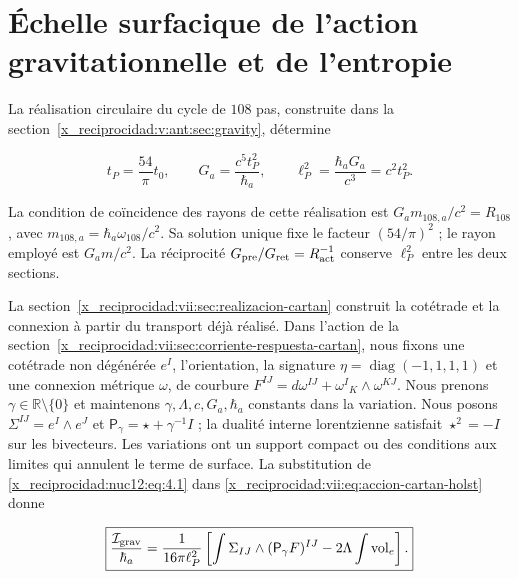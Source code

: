 \section{Échelle surfacique de l’action gravitationnelle et de l’entropie}

La réalisation circulaire du cycle de \(108\) pas, construite dans la section~\ref{x_reciprocidad:v:ant:sec:gravity}, détermine



\begin{equation}
t_P=\frac{54}{\pi}t_0,\qquad
G_a=\frac{c^5t_P^2}{\hbar_a},\qquad
\ell_P^2=\frac{\hbar_aG_a}{c^3}=c^2t_P^2.
\label{x_reciprocidad:nuc12:eq:4.1}
\end{equation}



La condition de coïncidence des rayons de cette réalisation est \(G_a m_{108,a}/c^2=R_{108}\), avec \(m_{108,a}=\hbar_a\omega_{108}/c^2\). Sa solution unique fixe le facteur \((54/\pi)^2\) ; le rayon employé est \(G_a m/c^2\). La réciprocité \(G_{\rm pre}/G_{\rm ret}=R_{\rm act}^{-1}\) conserve \(\ell_P^2\) entre les deux sections.

La section~\ref{x_reciprocidad:vii:sec:realizacion-cartan} construit la cotétrade et la connexion à partir du transport déjà réalisé. Dans l’action de la section~\ref{x_reciprocidad:vii:sec:corriente-respuesta-cartan}, nous fixons une cotétrade non dégénérée \(e^I\), l’orientation, la signature \(\eta=\operatorname{diag}(-1,1,1,1)\) et une connexion métrique \(\omega\), de courbure \(F^{IJ}=d\omega^{IJ}+\omega^I{}_{K}\wedge\omega^{KJ}\). Nous prenons \(\gamma\in\mathbb R\setminus\{0\}\) et maintenons \(\gamma,\Lambda,c,G_a,\hbar_a\) constants dans la variation. Nous posons \(\Sigma^{IJ}=e^I\wedge e^J\) et \(\mathsf P_\gamma=\star+\gamma^{-1}I\) ; la dualité interne lorentzienne satisfait \(\star^2=-I\) sur les bivecteurs. Les variations ont un support compact ou des conditions aux limites qui annulent le terme de surface. La substitution de \eqref{x_reciprocidad:nuc12:eq:4.1} dans \eqref{x_reciprocidad:vii:eq:accion-cartan-holst} donne



\begin{equation}
\boxed{\frac{\mathcal I_{\rm grav}}{\hbar_a}
=\frac1{16\pi\ell_P^2}
\left[\int\Sigma_{IJ}\wedge(\mathsf P_\gamma F)^{IJ}
-2\Lambda\int\operatorname{vol}_e\right].}
\label{x_reciprocidad:nuc12:eq:4.2}
\end{equation}



